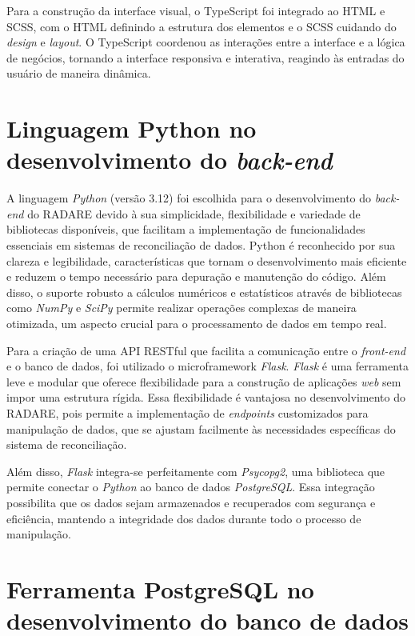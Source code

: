 Para a construção da interface visual, o TypeScript foi integrado ao HTML e SCSS, com o HTML definindo a estrutura dos elementos e o SCSS cuidando do \textit{design} e \textit{layout}. O TypeScript coordenou as interações entre a interface e a lógica de negócios, tornando a interface responsiva e interativa, reagindo às entradas do usuário de maneira dinâmica.

\section{Linguagem Python no desenvolvimento do \textit{back-end}}

A linguagem \textit{Python} (versão 3.12) foi escolhida para o desenvolvimento do \textit{back-end} do RADARE devido à sua simplicidade, flexibilidade e variedade de bibliotecas disponíveis, que facilitam a implementação de funcionalidades essenciais em sistemas de reconciliação de dados. Python é reconhecido por sua clareza e legibilidade, características que tornam o desenvolvimento mais eficiente e reduzem o tempo necessário para depuração e manutenção do código. Além disso, o suporte robusto a cálculos numéricos e estatísticos através de bibliotecas como \textit{NumPy} e \textit{SciPy} permite realizar operações complexas de maneira otimizada, um aspecto crucial para o processamento de dados em tempo real.

Para a criação de uma API RESTful que facilita a comunicação entre o \textit{front-end} e o banco de dados, foi utilizado o microframework \textit{Flask}. \textit{Flask} é uma ferramenta leve e modular que oferece flexibilidade para a construção de aplicações \textit{web} sem impor uma estrutura rígida. Essa flexibilidade é vantajosa no desenvolvimento do RADARE, pois permite a implementação de \textit{endpoints} customizados para manipulação de dados, que se ajustam facilmente às necessidades específicas do sistema de reconciliação.

Além disso, \textit{Flask} integra-se perfeitamente com \textit{Psycopg2}, uma biblioteca que permite conectar o \textit{Python} ao banco de dados \textit{PostgreSQL}. Essa integração possibilita que os dados sejam armazenados e recuperados com segurança e eficiência, mantendo a integridade dos dados durante todo o processo de manipulação.

\section{Ferramenta PostgreSQL no desenvolvimento do banco de dados}

